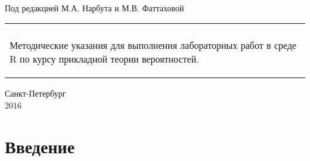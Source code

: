 \documentclass[a4paper,12pt]{article} %
\begin{document}
\begin{titlepage}

	\begin{center}

		\vspace{2cm}
		\\
		{\footnotesize Под редакцией М.А. Нарбута и М.В. Фаттаховой}
	\end{center} 

	\begin{center}
		\begin{tabular}{p{13cm}}
			\vspace{2cm}\\
			\begin{center}
				\vspace{1cm}
				\huge{Методические указания для выполнения лабораторных работ в среде R по курсу прикладной теории вероятностей.}
			\end{center}
		\end{tabular} 
	\end{center}

	\begin{center}
		\vspace{8cm}
		Санкт-Петербург\\
		2016
	\end{center}

\end{titlepage}


\tableofcontents 
\newpage

\section{Введение}
\end{document}
